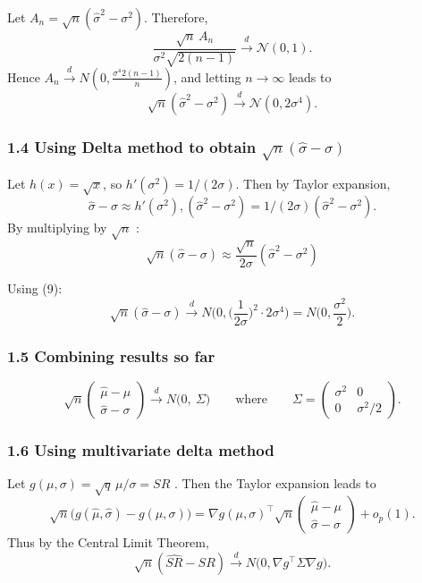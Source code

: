 \documentclass[
  12pt,
]{article}
\begin{document}
Let \(A_n=\sqrt{n}(\widehat\sigma^2-\sigma^2)\). Therefore, \[
\frac{\sqrt{n}\,A_n}{\sigma^2\sqrt{2(n-1)}} \xrightarrow{d} \mathcal{N}(0,1) \tag{8}.
\] Hence
\(A_n \xrightarrow{d} N\!\left(0,\frac{\sigma^4 2(n-1)}{n}\right)\), and
letting \(n\to\infty\) leads to \[
\sqrt{n}(\widehat\sigma^2-\sigma^2)\xrightarrow{d} \mathcal{N}(0,2\sigma^4) \tag{9}.
\]

\subsubsection{\texorpdfstring{1.4 Using Delta method to obtain
\(\sqrt{n}(\widehat\sigma-\sigma)\)}{1.4 Using Delta method to obtain \textbackslash sqrt\{n\}(\textbackslash widehat\textbackslash sigma-\textbackslash sigma)}}\label{using-delta-method-to-obtain-sqrtnwidehatsigma-sigma}

Let \(h(x)=\sqrt{x}\), so \(h'(\sigma^2)=1/(2\sigma)\). Then by Taylor
expansion, \[ 
\widehat\sigma-\sigma \approx h'(\sigma^2),(\widehat\sigma^2-\sigma^2)=1/(2\sigma)(\widehat\sigma^2-\sigma^2) \tag{10}.
\] By multiplying by \(\sqrt{n}\) : \[ 
\sqrt{n}(\widehat\sigma-\sigma) \approx \frac{\sqrt{n}}{2\sigma}(\widehat\sigma^2-\sigma^2) \tag{11} 
\]

Using (9): \[
\sqrt{n}(\widehat\sigma-\sigma)\xrightarrow{d} N\!\Big(0,\Big(\frac{1}{2\sigma}\Big)^2\cdot 2\sigma^4\Big)=N\!\Big(0,\frac{\sigma^2}{2}\Big) \tag{12}.
\]

\subsubsection{1.5 Combining results so
far}\label{combining-results-so-far}

\[
\sqrt{n}\begin{pmatrix}\widehat\mu-\mu\\[4pt]\widehat\sigma-\sigma\end{pmatrix}
\xrightarrow{d} N\!\Big(0,\ \Sigma\Big)  \qquad\text{where}\qquad
\Sigma=\begin{pmatrix}\sigma^2 & 0\\[6pt]0 & \sigma^2/2\end{pmatrix}.
\]

\subsubsection{1.6 Using multivariate delta
method}\label{using-multivariate-delta-method}

Let \(g(\mu,\sigma)=\sqrt{q}\,\mu/\sigma = SR\) . Then the Taylor
expansion leads to \[
\sqrt{n}\big(g(\widehat\mu,\widehat\sigma)-g(\mu,\sigma)\big)
= \nabla g(\mu,\sigma)^\top \sqrt{n}\begin{pmatrix}\widehat\mu-\mu\\[4pt]\widehat\sigma-\sigma\end{pmatrix} + o_p(1) \tag{13}.
\] Thus by the Central Limit Theorem, \[
\sqrt{n}(\widehat{SR}-SR)\xrightarrow{d} N\!\Big(0,\nabla g^\top\Sigma\nabla g\Big) \tag{14}.
\]
\end{document}
